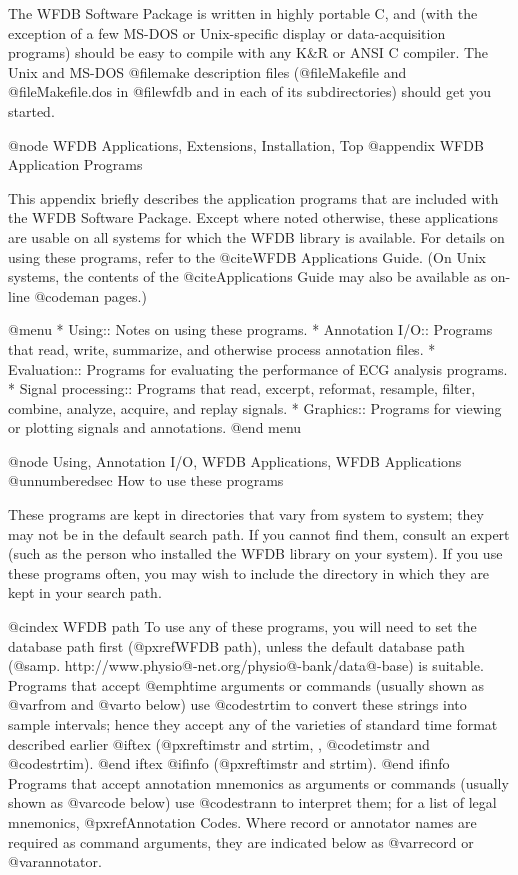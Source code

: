 {{{{{{{{{The WFDB Software Package is written in highly portable C, and (with the
exception of a few MS-DOS or Unix-specific display or data-acquisition
programs) should be easy to compile with any K&R or ANSI C compiler.
The Unix and MS-DOS @file{make} description files (@file{Makefile}
and @file{Makefile.dos} in @file{wfdb} and in each of its subdirectories)
should get you started.

@node     WFDB Applications, Extensions, Installation, Top
@appendix WFDB Application Programs

This appendix briefly describes the application programs that are
included with the WFDB Software Package.  Except where noted otherwise,
these applications are usable on all systems for which the WFDB library is
available.  For details on using these programs, refer to the @cite{WFDB
Applications Guide}.  (On Unix systems, the contents of the
@cite{Applications Guide} may also be available as on-line @code{man}
pages.)

@menu
* Using::		Notes on using these programs.
* Annotation I/O::	Programs that read, write, summarize, and
			otherwise process annotation files.
* Evaluation::		Programs for evaluating the performance of ECG
			analysis programs.
* Signal processing::	Programs that read, excerpt, reformat, resample,
			filter, combine, analyze, acquire, and replay signals.
* Graphics::		Programs for viewing or plotting signals and
			annotations.
@end menu

@node     Using, Annotation I/O, WFDB Applications, WFDB Applications
@unnumberedsec How to use these programs

These programs are kept in directories that vary from system to system;
they may not be in the default search path.  If you cannot find them,
consult an expert (such as the person who installed the WFDB library on
your system).  If you use these programs often, you may wish to include
the directory in which they are kept in your search path.

@cindex WFDB path
To use any of these programs, you will need to set the database path first
(@pxref{WFDB path}), unless the default database path
(@samp{. http://www.physio@-net.org/physio@-bank/data@-base}) is suitable.
Programs that accept @emph{time} arguments or commands (usually shown as
@var{from} and @var{to} below) use @code{strtim} to convert these strings into
sample intervals; hence they accept any of the varieties of standard time
format described earlier
@iftex
(@pxref{timstr and strtim, , @code{timstr} and @code{strtim}}).
@end iftex
@ifinfo
(@pxref{timstr and strtim}).
@end ifinfo
Programs that accept annotation mnemonics as arguments or commands
(usually shown as @var{code} below) use @code{strann} to interpret them;
for a list of legal mnemonics, @pxref{Annotation Codes}.  Where record
or annotator names are required as command arguments, they are indicated
below as @var{record} or @var{annotator}.

}}}}}}}}}
